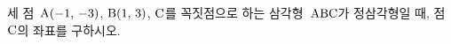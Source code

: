 세 점~$\mathrm{A}(-1,\mkern3mu -3)$, $\mathrm{B}(1,\mkern3mu 3)$, $\mathrm{C}$를 꼭짓점으로 하는 삼각형~$\mathrm{ABC}$가 정삼각형일 때, 점~$\mathrm{C}$의 좌표를 구하시오. 
